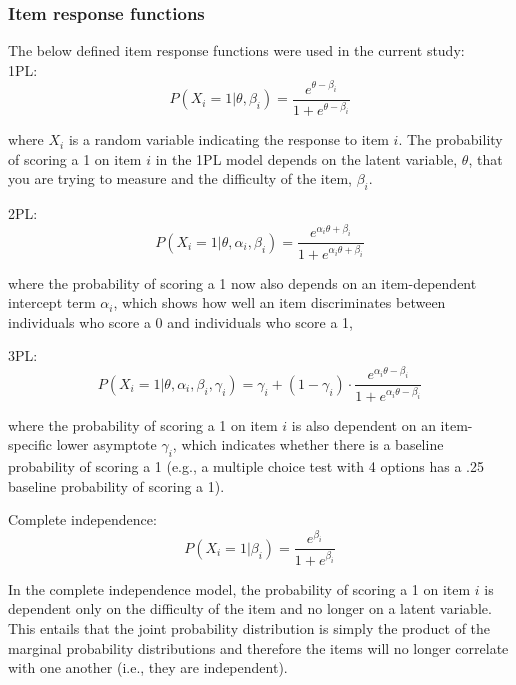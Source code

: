 \documentclass[Royal,sageapa,times,doublespace]{sagej}
\begin{document}
\subsubsection{Item response functions}
The below defined item response functions were used in the current study: \\
1PL:
\begin{equation}
P(X_i = 1 | \theta, \beta_{i}) = \frac{e^{\theta - \beta_{i}}}{1 + e^{\theta - \beta_{i}}}
\end{equation}

where $X_i$ is a random variable indicating the response to item $i$. The probability of scoring a 1 on item $i$ in the 1PL model depends on the latent
variable, $\theta$, that you are trying to measure and the difficulty of the item, $\beta_i$.

2PL:
\begin{equation}
P(X_i = 1 | \theta, \alpha_{i}, \beta_{i}) = \frac{e^{\alpha_{i}\theta + \beta_{i}}}{1 + e^{\alpha_{i}\theta + \beta_{i}}}
\end{equation}

where the probability of scoring a 1 now also depends on an item-dependent intercept term $\alpha_i$, which shows how well an item discriminates
between individuals who score a 0 and individuals who score a 1,

3PL:
\begin{equation}
P(X_i = 1 | \theta, \alpha_{i}, \beta_{i}, \gamma_{i}) = \gamma_{i} + (1 - \gamma_{i}) \cdot 
\frac{e^{\alpha_{i}\theta - \beta_{i}}}{1 + e^{\alpha_{i}\theta - \beta_{i}}}
\end{equation}

where the probability of scoring a 1 on item $i$ is also dependent on an item-specific lower asymptote $\gamma_i$, which indicates whether there is
a baseline probability of scoring a 1 (e.g., a multiple choice test with 4 options has a .25 baseline probability of scoring a 1).

Complete independence:
\begin{equation}
P(X_i = 1 | \beta_{i}) = \frac{e^{\beta_{i}}}{1 + e^{\beta_{i}}}
\end{equation}

In the complete independence model, the probability of scoring a 1 on item $i$ is dependent only on the difficulty of the item and no longer on
a latent variable. This entails that the joint probability distribution is simply the product of the marginal probability distributions and therefore the
items will no longer correlate with one another (i.e., they are independent).
\end{document}
